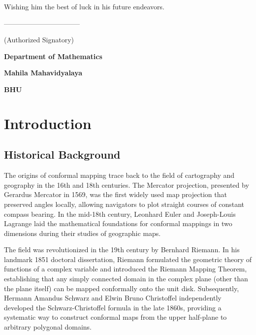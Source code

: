 \documentclass[12pt,a4paper]{article}
\begin{document}
\vspace{0.2cm}

\noindent Wishing him the best of luck in his future endeavors.

\vspace{3cm}

\noindent ---------------------------------

\vspace{0.2cm}
\noindent (Authorized Signatory)

\vspace{0.3cm}
\noindent \textbf{Department of Mathematics}

\vspace{0.3cm}
\noindent \textbf{Mahila Mahavidyalaya}

\vspace{0.3cm}
\noindent \textbf{BHU}

\newpage
\restoregeometry

\tableofcontents
\newpage
{}

\section{Introduction}
\subsection{Historical Background}
The origins of conformal mapping trace back to the field of cartography and geography in the 16th and 18th centuries. The Mercator projection, presented by Gerardus Mercator in 1569, was the first widely used map projection that preserved angles locally, allowing navigators to plot straight courses of constant compass bearing. In the mid-18th century, Leonhard Euler and Joseph-Louis Lagrange laid the mathematical foundations for conformal mappings in two dimensions during their studies of geographic maps.

The field was revolutionized in the 19th century by Bernhard Riemann. In his landmark 1851 doctoral dissertation, Riemann formulated the geometric theory of functions of a complex variable and introduced the Riemann Mapping Theorem, establishing that any simply connected domain in the complex plane (other than the plane itself) can be mapped conformally onto the unit disk. Subsequently, Hermann Amandus Schwarz and Elwin Bruno Christoffel independently developed the Schwarz-Christoffel formula in the late 1860s, providing a systematic way to construct conformal maps from the upper half-plane to arbitrary polygonal domains.
\end{document}
